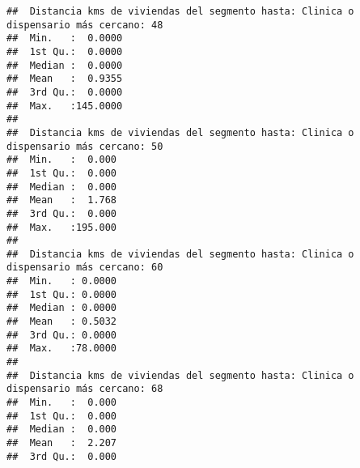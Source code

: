 \documentclass[11pt,]{article}
\begin{document}
\begin{verbatim}
##  Distancia kms de viviendas del segmento hasta: Clinica o dispensario más cercano: 48
##  Min.   :  0.0000                                                                    
##  1st Qu.:  0.0000                                                                    
##  Median :  0.0000                                                                    
##  Mean   :  0.9355                                                                    
##  3rd Qu.:  0.0000                                                                    
##  Max.   :145.0000                                                                    
##                                                                                      
##  Distancia kms de viviendas del segmento hasta: Clinica o dispensario más cercano: 50
##  Min.   :  0.000                                                                     
##  1st Qu.:  0.000                                                                     
##  Median :  0.000                                                                     
##  Mean   :  1.768                                                                     
##  3rd Qu.:  0.000                                                                     
##  Max.   :195.000                                                                     
##                                                                                      
##  Distancia kms de viviendas del segmento hasta: Clinica o dispensario más cercano: 60
##  Min.   : 0.0000                                                                     
##  1st Qu.: 0.0000                                                                     
##  Median : 0.0000                                                                     
##  Mean   : 0.5032                                                                     
##  3rd Qu.: 0.0000                                                                     
##  Max.   :78.0000                                                                     
##                                                                                      
##  Distancia kms de viviendas del segmento hasta: Clinica o dispensario más cercano: 68
##  Min.   :  0.000                                                                     
##  1st Qu.:  0.000                                                                     
##  Median :  0.000                                                                     
##  Mean   :  2.207                                                                     
##  3rd Qu.:  0.000                                                                     

\end{verbatim}
\end{document}
